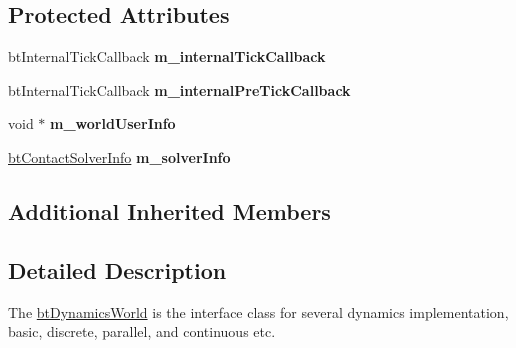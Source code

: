 \subsection*{Protected Attributes}
\begin{DoxyCompactItemize}
\item 
\hypertarget{classbt_dynamics_world_a705c6e3e8c08da630f5c6ad47fb0956e}{bt\+Internal\+Tick\+Callback {\bfseries m\+\_\+internal\+Tick\+Callback}}\label{classbt_dynamics_world_a705c6e3e8c08da630f5c6ad47fb0956e}

\item 
\hypertarget{classbt_dynamics_world_a72c993a0878ed549579516b9e123b87a}{bt\+Internal\+Tick\+Callback {\bfseries m\+\_\+internal\+Pre\+Tick\+Callback}}\label{classbt_dynamics_world_a72c993a0878ed549579516b9e123b87a}

\item 
\hypertarget{classbt_dynamics_world_ad1938eab3c06e3c85d3739eb2b7a5d4c}{void $\ast$ {\bfseries m\+\_\+world\+User\+Info}}\label{classbt_dynamics_world_ad1938eab3c06e3c85d3739eb2b7a5d4c}

\item 
\hypertarget{classbt_dynamics_world_a3e879581a620599c279b64bedaf8d583}{\hyperlink{structbt_contact_solver_info}{bt\+Contact\+Solver\+Info} {\bfseries m\+\_\+solver\+Info}}\label{classbt_dynamics_world_a3e879581a620599c279b64bedaf8d583}

\end{DoxyCompactItemize}
\subsection*{Additional Inherited Members}


\subsection{Detailed Description}
The \hyperlink{classbt_dynamics_world}{bt\+Dynamics\+World} is the interface class for several dynamics implementation, basic, discrete, parallel, and continuous etc. 

